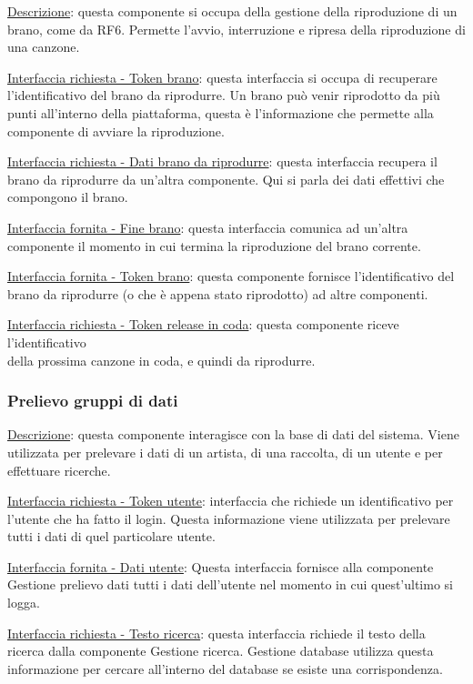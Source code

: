 \documentclass[a4paper,12pt]{article}
\begin{document}
\underline{Descrizione}: questa componente si occupa della gestione della riproduzione di un brano, come da RF6. Permette l’avvio, interruzione e ripresa della riproduzione di una canzone.

\underline{Interfaccia richiesta - Token brano}: questa interfaccia si occupa di recuperare l’identificativo del brano da riprodurre. Un brano può venir riprodotto da più punti all’interno della piattaforma, questa è l’informazione che permette alla componente di avviare la riproduzione.

\underline{Interfaccia richiesta - Dati brano da riprodurre}: questa interfaccia recupera il brano da riprodurre da un’altra componente. Qui si parla dei dati effettivi che compongono il brano.

\underline{Interfaccia fornita - Fine brano}: questa interfaccia comunica ad un’altra componente il momento in cui termina la riproduzione del brano corrente.

\underline{Interfaccia fornita - Token brano}: questa componente fornisce l’identificativo del brano da riprodurre (o che è appena stato riprodotto) ad altre componenti.

\underline{Interfaccia richiesta - Token release in coda}: questa componente riceve l'identificativo \\ della prossima canzone in coda, e quindi da riprodurre.

\subsubsection{Prelievo gruppi di dati}

\underline{Descrizione}: questa componente interagisce con la base di dati del sistema. Viene utilizzata per prelevare i dati di un artista, di una raccolta, di un utente e per effettuare ricerche.

\underline{Interfaccia richiesta - Token utente}: interfaccia che richiede un identificativo per l’utente che ha fatto il login. Questa informazione viene utilizzata per prelevare tutti i dati di quel particolare utente.

\underline{Interfaccia fornita - Dati utente}: Questa interfaccia fornisce alla componente Gestione prelievo dati tutti i dati dell’utente nel momento in cui quest’ultimo si logga.

\underline{Interfaccia richiesta - Testo ricerca}: questa interfaccia richiede il testo della ricerca dalla componente Gestione ricerca. Gestione database utilizza questa informazione per cercare all’interno del database se esiste una corrispondenza.
\end{document}
